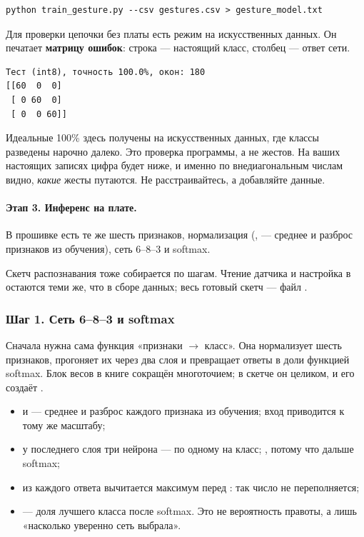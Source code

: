 \begin{Verbatim}[fontsize=\small,bgcolor=codebg]
python train_gesture.py --csv gestures.csv > gesture_model.txt
\end{Verbatim}

Для проверки цепочки без платы есть режим  на искусственных данных. Он печатает
\textbf{матрицу ошибок}: строка --- настоящий класс, столбец --- ответ сети.

\begin{Verbatim}[fontsize=\small,bgcolor=codebg]
Тест (int8), точность 100.0%, окон: 180
[[60  0  0]
 [ 0 60  0]
 [ 0  0 60]]
\end{Verbatim}

Идеальные 100\% здесь получены на искусственных данных, где классы разведены нарочно далеко. Это
проверка программы, а не жестов. На ваших настоящих записях цифра будет ниже, и именно по
внедиагональным числам видно, \emph{какие} жесты путаются. Не расстраивайтесь, а добавляйте данные.

\paragraph{Этап 3. Инференс на плате.} В прошивке есть те же шесть признаков, нормализация
(,  --- среднее и разброс признаков из обучения), сеть 6--8--3 и softmax.

Скетч распознавания тоже собирается по шагам. Чтение датчика  и настройка в 
остаются теми же, что в сборе данных; весь готовый скетч --- файл .

\subsubsection{Шаг 1. Сеть 6--8--3 и softmax}

Сначала нужна сама функция «признаки $\to$ класс». Она нормализует шесть признаков, прогоняет их через два
слоя  и превращает ответы в доли функцией softmax. Блок весов в книге сокращён многоточием;
в скетче он целиком, и его создаёт .


\begin{itemize}[leftmargin=*]
  \item {} и  --- среднее и разброс каждого признака из обучения; вход приводится к
        тому же масштабу;
  \item у последнего слоя три нейрона --- по одному на класс; , потому что дальше softmax;
  \item из каждого ответа вычитается максимум перед : так число не переполняется;
  \item {} --- доля лучшего класса после softmax. Это не вероятность правоты, а лишь
        «насколько уверенно сеть выбрала».
\end{itemize}

